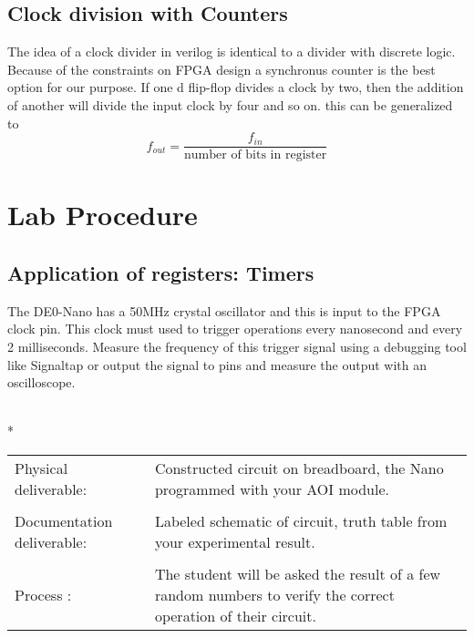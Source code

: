   \subsection{Clock division with Counters}
    The idea of a clock divider in verilog is identical to a divider with discrete logic. Because of the constraints on FPGA design a synchronus counter is the best option for our purpose. If one d flip-flop divides a clock by two, then the addition of another will divide the input clock by four and so on. this can be generalized to $$f_{out}=\frac{f_{in}}{\text{number of bits in register}}$$ 
    
\section{Lab Procedure}

  \subsection{Application of registers: Timers}
      The DE0-Nano has a 50MHz crystal oscillator and this is input to the FPGA clock pin.  This clock must used to trigger operations every nanosecond and every 2 milliseconds.  Measure the frequency  of this trigger signal using a debugging tool like Signaltap or output the signal to pins and measure the output with an oscilloscope.
     
    \vspace{15px}
    \begin{centering}
      \begin{fminipage}{.45\textwidth}
        \vspace{3px}
        \\*
        \vspace{10px}
        \begin{tabular}{p{1.8cm}  p{5.4cm}}
          \raggedright Physical deliverable:                & Constructed circuit on breadboard,  the Nano programmed with your AOI module.\\
          \\
          \raggedright Documentation deliverable:           & Labeled schematic of circuit,  truth table from your  experimental result.\\
          \\
          Process :                                         & The student will be asked the result of a few random numbers to verify the correct operation of their circuit.
        \end{tabular}
      \end{fminipage}
    \end{centering} 

